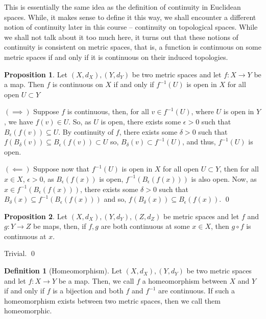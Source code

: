 \documentclass[
]{article}
\theoremstyle{definition}
\newtheorem{prop}{Proposition}
\theoremstyle{definition}
\newtheorem{definition}{Definition}[section]
\begin{document}
This is essentially the same idea as the definition of continuity in
Euclidean spaces. While, it makes sense to define it this way, we shall
encounter a different notion of continuity later in this course --
continuity on topological spaces. While we shall not talk about it too
much here, it turns out that these notions of continuity is consistent
on metric spaces, that is, a function is continuous on some metric
spaces if and only if it is continuous on their induced topologies.

\begin{prop}
  Let \((X, d_X), (Y, d_Y)\) be two metric spaces and let \(f : X \to Y\) be 
  a map. Then \(f\) is continuous on \(X\) if and only if \(f^{-1}(U)\) is open 
  in \(X\) for all open \(U \subset Y\)
\end{prop}
\proof

\((\implies)\) Suppose \(f\) is continuous, then, for all
\(v \in f^{-1}(U)\), where \(U\) is open in \(Y\), we have
\(f(v) \in U\). So, as \(U\) is open, there exists some \(\epsilon > 0\)
such that \(B_\epsilon(f(v)) \subseteq U\). By continuity of \(f\),
there exists some \(\delta > 0\) such that
\(f(B_\delta(v)) \subseteq B_\epsilon(f(v)) \subset U\) so,
\(B_\delta(v) \subset f^{-1}(U)\), and thus, \(f^{-1}(U)\) is open.

\((\impliedby)\) Suppose now that \(f^{-1}(U)\) is open in \(X\) for all
open \(U \subset Y\), then for all \(x \in X\), \(\epsilon > 0\), as
\(B_\epsilon(f(x))\) is open, \(f^{-1}(B_\epsilon(f(x)))\) is also open.
Now, as \(x \in f^{-1}(B_\epsilon(f(x)))\), there exists some
\(\delta > 0\) such that
\(B_\delta(x) \subseteq f^{-1}(B_\epsilon(f(x)))\) and so,
\(f(B_\delta(x)) \subseteq B_\epsilon(f(x))\). \qed

\begin{prop}
  Let \((X, d_X), (Y, d_Y), (Z, d_Z)\) be metric spaces and let 
  \(f\) and \(g : Y \to Z\) be maps, then, if \(f, g\) are both continuous at 
  some \(x \in X\), then \(g \circ f\) is continuous at \(x\).
\end{prop}
\proof

Trivial. \qed

\begin{definition}[Homeomorphism]
  Let \((X, d_X), (Y, d_Y)\) be two metric spaces and let \(f : X \to Y\) be 
  a map. Then, we call \(f\) a homeomorphism between \(X\) and \(Y\) if and only 
  if \(f\) is a bijection and both \(f\) and \(f^{-1}\) are continuous. If such 
  a homeomorphism exists between two metric spaces, then we call them homeomorphic.
\end{definition}
\end{document}
